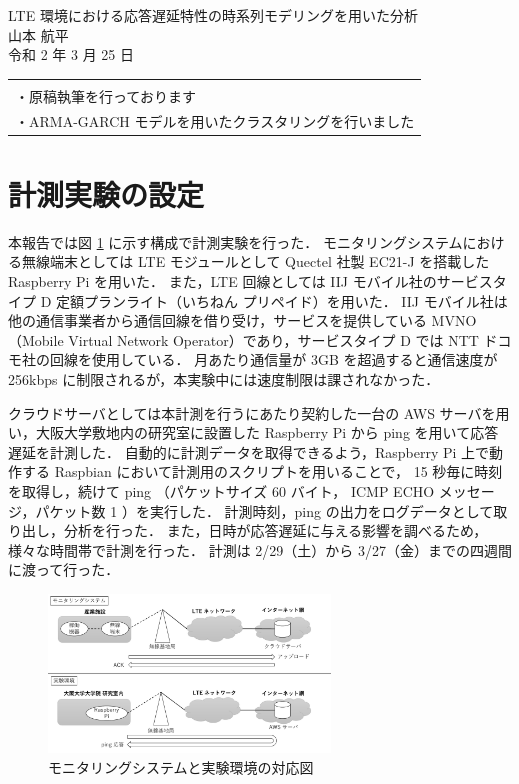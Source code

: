 \documentclass[a4j]{jarticle}
\begin{document}
\begin{table}[t]
\begin{center}
{\Large LTE 環境における応答遅延特性の時系列モデリングを用いた分析}\\
山本 航平\\
令和 2 年 3 月 25 日
\end{center}
\vspace{1cm}
\begin{tabular}{l}
\hspace{0.5cm}{\large -進捗報告-}\\
・原稿執筆を行っております\\
・ARMA-GARCH モデルを用いたクラスタリングを行いました\\
\end{tabular}
\end{table}

\section{計測実験の設定}
本報告では図 \ref{exp} に示す構成で計測実験を行った．
モニタリングシステムにおける無線端末としては LTE モジュールとして Quectel 社製 EC21-J を搭載した Raspberry Pi を用いた．
また，LTE 回線としては IIJ モバイル社のサービスタイプ D 定額プランライト（いちねん プリペイド）を用いた．
IIJ モバイル社は他の通信事業者から通信回線を借り受け，サービスを提供している MVNO（Mobile Virtual Network Operator）であり，サービスタイプ D では NTT ドコモ社の回線を使用している．
月あたり通信量が 3GB を超過すると通信速度が 256kbps に制限されるが，本実験中には速度制限は課されなかった．

クラウドサーバとしては本計測を行うにあたり契約した一台の AWS サーバを用い，大阪大学敷地内の研究室に設置した Raspberry Pi から ping を用いて応答遅延を計測した．
自動的に計測データを取得できるよう，Raspberry Pi 上で動作する Raspbian において計測用のスクリプトを用いることで， 15 秒毎に時刻を取得し，続けて ping （パケットサイズ 60 バイト， ICMP ECHO メッセージ，パケット数 1 ）を実行した．
計測時刻，ping の出力をログデータとして取り出し，分析を行った．
また，日時が応答遅延に与える影響を調べるため，様々な時間帯で計測を行った．
計測は 2/29（土）から 3/27（金）までの四週間に渡って行った．
\begin{figure}[tb]
\centering
\includegraphics[width=7.5cm]{../figure/experiment.pdf}
\caption{モニタリングシステムと実験環境の対応図}
\label{exp}
\end{figure}
\end{document}
